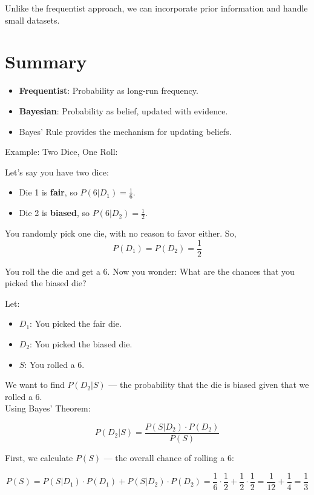 \documentclass{book}
\begin{document}
Unlike the frequentist approach, we can incorporate prior information and handle small datasets.

\section{Summary}

\begin{itemize}
    \item \textbf{Frequentist}: Probability as long-run frequency.
    \item \textbf{Bayesian}: Probability as belief, updated with evidence.
    \item Bayes’ Rule provides the mechanism for updating beliefs.
\end{itemize}

\newpage

Example: Two Dice, One Roll:

Let’s say you have two dice:
\begin{itemize}
  \item Die 1 is \textbf{fair}, so $P(6|D_1) = \frac{1}{6}$.
  \item Die 2 is \textbf{biased}, so $P(6|D_2) = \frac{1}{2}$.
\end{itemize}

You randomly pick one die, with no reason to favor either. So,
\[
P(D_1) = P(D_2) = \frac{1}{2}
\]

You roll the die and get a 6. Now you wonder: What are the chances that you picked the biased die?

Let:
\begin{itemize}
  \item $D_1$: You picked the fair die.
  \item $D_2$: You picked the biased die.
  \item $S$: You rolled a 6.
\end{itemize}

We want to find $P(D_2 | S)$ — the probability that the die is biased given that we rolled a 6.\\

Using Bayes’ Theorem:

\[
P(D_2 | S) = \frac{P(S | D_2) \cdot P(D_2)}{P(S)}
\]

First, we calculate $P(S)$ — the overall chance of rolling a 6:

\[
P(S) = P(S|D_1) \cdot P(D_1) + P(S|D_2) \cdot P(D_2) = \frac{1}{6} \cdot \frac{1}{2} + \frac{1}{2} \cdot \frac{1}{2}
= \frac{1}{12} + \frac{1}{4} = \frac{1}{3}
\]
\end{document}

